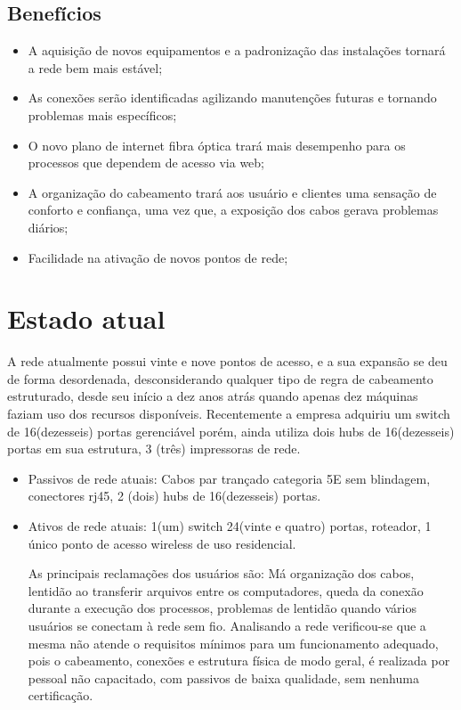 \documentclass[	DIV=calc,%
							paper=a4,%
							fontsize=12pt,%
							onecolumn]{scrartcl}	 					%
\begin{document}
\subsection{Benefícios}

\begin{itemize}
	\item A aquisição de novos equipamentos e a padronização das instalações tornará a rede bem mais estável;
	\item As conexões serão identificadas agilizando manutenções futuras e tornando problemas mais específicos;
	\item O novo plano de internet fibra óptica trará mais desempenho para os processos que dependem de acesso via web;
	\item A organização do cabeamento trará aos usuário e clientes uma sensação de conforto e confiança, uma vez que, a exposição dos cabos gerava problemas diários; 
	\item Facilidade na ativação de novos pontos de rede;
\end{itemize}

\section{Estado atual}
A rede atualmente possui vinte e nove pontos de acesso, e a sua expansão se deu de forma desordenada, desconsiderando qualquer tipo de regra de cabeamento estruturado, desde seu início a dez anos atrás quando apenas dez máquinas faziam uso dos recursos disponíveis. Recentemente a empresa adquiriu um switch de 16(dezesseis) portas gerenciável porém, ainda utiliza dois hubs de 16(dezesseis) portas em sua estrutura, 3 (três) impressoras de rede.

\begin{itemize}
	\item Passivos de rede atuais: Cabos par trançado categoria 5E sem blindagem, conectores rj45, 2 (dois) hubs de 16(dezesseis) portas. 
	\item Ativos de rede atuais: 1(um) switch 24(vinte e quatro) portas, roteador, 1 único ponto de acesso wireless de uso residencial.
	
As principais reclamações dos usuários são: Má organização dos cabos, lentidão ao transferir arquivos entre os computadores, queda da conexão durante a execução dos processos, problemas de lentidão quando vários usuários se conectam à rede sem fio.
Analisando a rede verificou-se que a mesma não atende o requisitos mínimos para um funcionamento adequado, pois o cabeamento, conexões e estrutura física de modo geral, é realizada por pessoal não capacitado, com passivos de baixa qualidade, sem nenhuma certificação.

\end{itemize}
\end{document}
